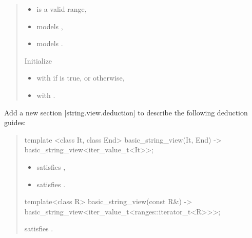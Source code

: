 \documentclass{wg21}
\begin{document}
\begin{quote}
\begin{addedblock}
\begin{itemdescr}
    \expects
    \begin{itemize}
	    \item {} is a valid range,
	    \item {} models ,
    	\item {} models .
	\end{itemize}

    \effects
    Initialize
    
    \begin{itemize}
    	\item {} with  if  is true, or  otherwise,
    	\item {} with .
    \end{itemize}

\end{itemdescr}
\end{addedblock}
\end{quote}


Add a new section [string.view.deduction] to describe the following deduction guides:



\begin{quote}
\begin{addedblock}
\begin{itemdecl}
template <class It, class End>
basic_string_view(It, End) -> basic_string_view<iter_value_t<It>>;
\end{itemdecl}
\begin{itemdescr}
    \constraints
    \begin{itemize}
        \item {} satisfies ,
        \item {} satisfies .
    \end{itemize}
\end{itemdescr}

\begin{itemdecl}
template<class R>
basic_string_view(const R&)
-> basic_string_view<iter_value_t<ranges::iterator_t<R>>>;
\end{itemdecl}
\begin{itemdescr}
    \constraints {} satisfies .
\end{itemdescr}

\end{addedblock}
\end{quote}
\end{document}
